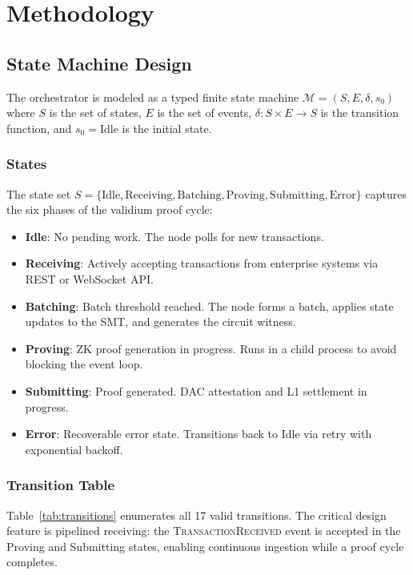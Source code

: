 
\section{Methodology}

\subsection{State Machine Design}

The orchestrator is modeled as a typed finite state machine
$\mathcal{M} = (S, E, \delta, s_0)$ where $S$ is the set of states,
$E$ is the set of events, $\delta: S \times E \to S$ is the transition
function, and $s_0 = \text{Idle}$ is the initial state.

\subsubsection{States}

The state set $S = \{\text{Idle}, \text{Receiving}, \text{Batching},
\text{Proving}, \text{Submitting}, \text{Error}\}$ captures the six
phases of the validium proof cycle:

\begin{itemize}
\item \textbf{Idle}: No pending work. The node polls for new transactions.
\item \textbf{Receiving}: Actively accepting transactions from enterprise
  systems via REST or WebSocket API.
\item \textbf{Batching}: Batch threshold reached. The node forms a batch,
  applies state updates to the SMT, and generates the circuit witness.
\item \textbf{Proving}: ZK proof generation in progress. Runs in a child
  process to avoid blocking the event loop.
\item \textbf{Submitting}: Proof generated. DAC attestation and L1
  settlement in progress.
\item \textbf{Error}: Recoverable error state. Transitions back to Idle
  via retry with exponential backoff.
\end{itemize}

\subsubsection{Transition Table}

Table~\ref{tab:transitions} enumerates all 17 valid transitions. The
critical design feature is pipelined receiving: the \textsc{TransactionReceived}
event is accepted in the Proving and Submitting states, enabling continuous
ingestion while a proof cycle completes.

